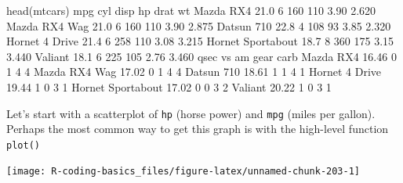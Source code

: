 \documentclass[
]{book}
\newenvironment{Shaded}{\begin{snugshade}}{\end{snugshade}}
\newcommand{\CommentTok}[1]{\textcolor[rgb]{0.56,0.35,0.01}{\textit{#1}}}
\newcommand{\DecValTok}[1]{\textcolor[rgb]{0.00,0.00,0.81}{#1}}
\newcommand{\FloatTok}[1]{\textcolor[rgb]{0.00,0.00,0.81}{#1}}
\newcommand{\FunctionTok}[1]{\textcolor[rgb]{0.00,0.00,0.00}{#1}}
\newcommand{\NormalTok}[1]{#1}
\newcommand{\SpecialCharTok}[1]{\textcolor[rgb]{0.00,0.00,0.00}{#1}}
\begin{document}
\begin{Shaded}
\begin{Highlighting}[]
\FunctionTok{head}\NormalTok{(mtcars)}
\NormalTok{                   mpg cyl disp  hp drat    wt}
\NormalTok{Mazda RX4         }\FloatTok{21.0}   \DecValTok{6}  \DecValTok{160} \DecValTok{110} \FloatTok{3.90} \FloatTok{2.620}
\NormalTok{Mazda RX4 Wag     }\FloatTok{21.0}   \DecValTok{6}  \DecValTok{160} \DecValTok{110} \FloatTok{3.90} \FloatTok{2.875}
\NormalTok{Datsun }\DecValTok{710}        \FloatTok{22.8}   \DecValTok{4}  \DecValTok{108}  \DecValTok{93} \FloatTok{3.85} \FloatTok{2.320}
\NormalTok{Hornet }\DecValTok{4}\NormalTok{ Drive    }\FloatTok{21.4}   \DecValTok{6}  \DecValTok{258} \DecValTok{110} \FloatTok{3.08} \FloatTok{3.215}
\NormalTok{Hornet Sportabout }\FloatTok{18.7}   \DecValTok{8}  \DecValTok{360} \DecValTok{175} \FloatTok{3.15} \FloatTok{3.440}
\NormalTok{Valiant           }\FloatTok{18.1}   \DecValTok{6}  \DecValTok{225} \DecValTok{105} \FloatTok{2.76} \FloatTok{3.460}
\NormalTok{                   qsec vs am gear carb}
\NormalTok{Mazda RX4         }\FloatTok{16.46}  \DecValTok{0}  \DecValTok{1}    \DecValTok{4}    \DecValTok{4}
\NormalTok{Mazda RX4 Wag     }\FloatTok{17.02}  \DecValTok{0}  \DecValTok{1}    \DecValTok{4}    \DecValTok{4}
\NormalTok{Datsun }\DecValTok{710}        \FloatTok{18.61}  \DecValTok{1}  \DecValTok{1}    \DecValTok{4}    \DecValTok{1}
\NormalTok{Hornet }\DecValTok{4}\NormalTok{ Drive    }\FloatTok{19.44}  \DecValTok{1}  \DecValTok{0}    \DecValTok{3}    \DecValTok{1}
\NormalTok{Hornet Sportabout }\FloatTok{17.02}  \DecValTok{0}  \DecValTok{0}    \DecValTok{3}    \DecValTok{2}
\NormalTok{Valiant           }\FloatTok{20.22}  \DecValTok{1}  \DecValTok{0}    \DecValTok{3}    \DecValTok{1}
\end{Highlighting}
\end{Shaded}

Let's start with a scatterplot of \texttt{hp} (horse power) and \texttt{mpg} (miles per
gallon). Perhaps the most common way to get this graph is with the high-level
function \texttt{plot()}

\begin{Shaded}
\end{Shaded}

\begin{center}\texttt{[image: R-coding-basics\_files/figure-latex/unnamed-chunk-203-1]} \end{center}
\end{document}

